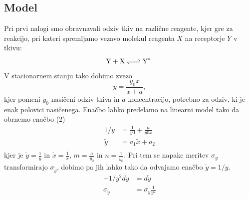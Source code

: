 \documentclass[11pt, a4paper]{article}
\begin{document}
\subsection{Model}
Pri prvi nalogi smo obravnavali odziv tkiv na različne reagente, kjer gre za reakcijo, pri kateri spremljamo vezavo molekul reagenta $X$ na receptorje $Y$ v tkivu:
\begin{equation}
\ce{Y + X <=>Y^*}.
\end{equation}
V stacionarnem stanju tako dobimo zvezo
\begin{equation}
y=\frac{y_0x}{x+a},
\end{equation}
kjer pomeni $y_0$ nasičeni odziv tkiva in $a$ koncentracijo, potrebno za odziv, ki je enak polovici nasičenega. Enačbo lahko predelamo na linearni model tako da obrnemo enačbo (2)
\begin{equation}
\begin{split}
1/y &= \frac{1}{y0} + \frac{a}{y0x} \\
\widetilde{y} &= a_1\widetilde{x} + a_2 \\
\end{split}
\end{equation}
kjer je $\widetilde{y}=\frac{1}{y}$ in $\widetilde{x}=\frac{1}{x}$, $m=\frac{a}{y_0}$ in $n=\frac{1}{y_0}$. Pri tem se napake meritev $\sigma_y$ transformirajo $\sigma_{\widetilde{y}}$, dobimo pa jih lahko tako da odvajamo enačbo $\widetilde{y} = 1/y$.
\begin{equation}
\begin{split}
- 1/y^2 dy &=  d\widetilde{y} \\
\sigma_ {\widetilde{y}} &= \sigma_y \frac{1}{y^2}
\end{split}
\end{equation}
\end{document}
